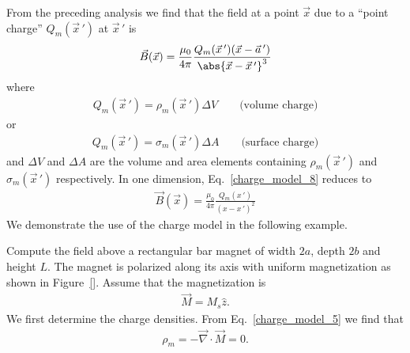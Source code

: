 \documentclass[12pt,a4paper,oneside]{book}
\begin{document}
\begin{onehalfspace}
From the preceding analysis we find that the field at a point $\vec{x}$ due to a “point charge” $Q_m(\vec{x}\,')$ at $\vec{x}\,'$ is
\begin{equation}\label{charge_model_8}
	{\begin{aligned}
			\vec{B}(\vec{x}) = \frac{\mu_0}{4\pi}\frac{Q_m(\vec{x}\,')(\vec{x}-\vec{a}\,')}{\abs{\vec{x}-\vec{x}\,'}^3}
	\end{aligned}}
\end{equation} 
where 
\begin{equation}\label{charge_model_9}
	{\begin{aligned}
		Q_m(\vec{x}\,') = \rho_m(\vec{x}\,')\Delta V\qquad\text{(volume charge)}
	\end{aligned}}
\end{equation} 
or 
\begin{equation}\label{charge_model_10}
	{\begin{aligned}
			Q_m(\vec{x}\,') = \sigma_m(\vec{x}\,')\Delta A\qquad\text{(surface charge)}
	\end{aligned}}
\end{equation} 
and $\Delta V$ and $\Delta A$ are the volume and area elements containing $\rho_m(\vec{x}\,')$ and $\sigma_m(\vec{x}\,')$ respectively. In one dimension, Eq.~\eqref{charge_model_8} reduces to
\begin{equation}\label{charge_model_11}
	\boxed{\begin{aligned}
			\vec{B}(\vec{x}) = \frac{\mu_0}{4\pi}\frac{Q_m({x}\,')}{({x}-{x}\,')^2}
	\end{aligned}}
\end{equation} 
We demonstrate the use of the charge model in the following example.
\begin{example}
	Compute the field above a rectangular bar magnet of width $2a$, depth $2b$ and height $L$. The magnet is polarized along its axis with uniform magnetization as shown in Figure~\ref{}. Assume that the magnetization is 
	\begin{equation}\label{charge_model_12}
		{\begin{aligned}
				\vec{M} = M_s\hat{z}.
		\end{aligned}}
	\end{equation} 
We first determine the charge densities. From Eq.~\eqref{charge_model_5} we find that
\begin{equation}\label{charge_model_13}
{\begin{aligned}
		\rho_m = -\vec{\nabla}\cdot\vec{M}=0.
\end{aligned}}

\end{equation}
\end{example}
\end{onehalfspace}
\end{document}
